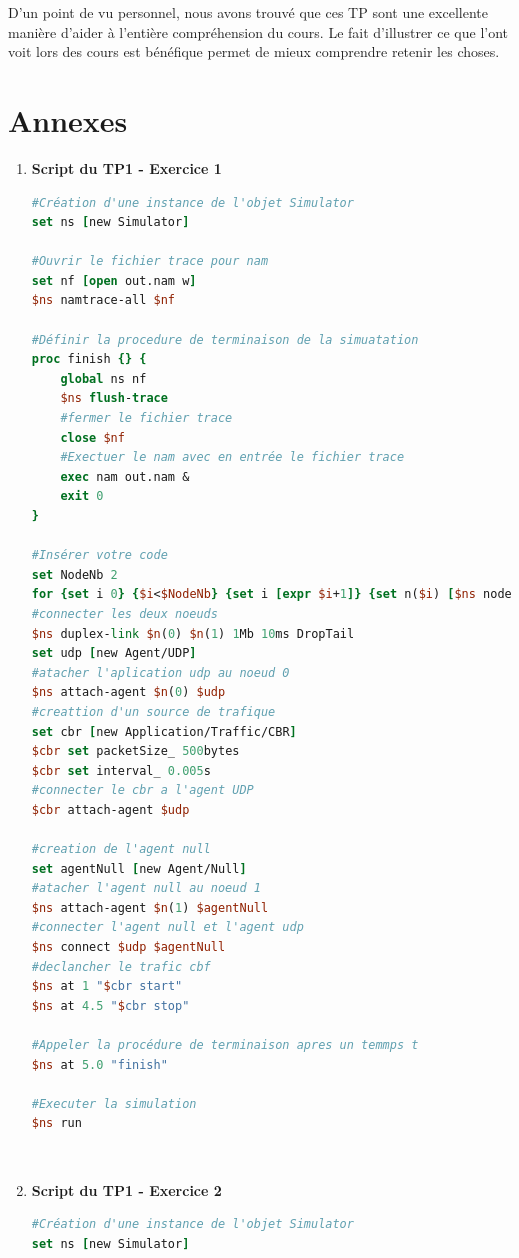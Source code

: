 \documentclass[11pt]{article}
\begin{document}
D'un point de vu personnel, nous avons trouvé que ces TP sont une excellente manière d'aider à l'entière compréhension du cours. Le fait d'illustrer ce que l'ont voit lors des cours est bénéfique permet de mieux comprendre retenir les choses.

\pagebreak
\section*{Annexes}

\begin{enumerate}
	
	\item \textbf{Script du TP1 - Exercice 1}

\begin{lstlisting}[language=tcl, label={tp1Exo1}, caption={TP1 - Exercice1}]
#Création d'une instance de l'objet Simulator
set ns [new Simulator]

#Ouvrir le fichier trace pour nam
set nf [open out.nam w]
$ns namtrace-all $nf

#Définir la procedure de terminaison de la simuatation
proc finish {} {
	global ns nf
	$ns flush-trace
	#fermer le fichier trace
	close $nf
	#Exectuer le nam avec en entrée le fichier trace
	exec nam out.nam &
	exit 0
}

#Insérer votre code
set NodeNb 2
for {set i 0} {$i<$NodeNb} {set i [expr $i+1]} {set n($i) [$ns node]}
#connecter les deux noeuds
$ns duplex-link $n(0) $n(1) 1Mb 10ms DropTail
set udp [new Agent/UDP]
#atacher l'aplication udp au noeud 0
$ns attach-agent $n(0) $udp 
#creattion d'un source de trafique
set cbr [new Application/Traffic/CBR]
$cbr set packetSize_ 500bytes
$cbr set interval_ 0.005s
#connecter le cbr a l'agent UDP
$cbr attach-agent $udp

#creation de l'agent null
set agentNull [new Agent/Null]
#atacher l'agent null au noeud 1
$ns attach-agent $n(1) $agentNull 
#connecter l'agent null et l'agent udp
$ns connect $udp $agentNull 
#declancher le trafic cbf
$ns at 1 "$cbr start"
$ns at 4.5 "$cbr stop"

#Appeler la procédure de terminaison apres un temmps t 
$ns at 5.0 "finish"

#Executer la simulation
$ns run
\end{lstlisting} 

~\\

\item \textbf{Script du TP1 - Exercice 2}
\begin{lstlisting}[language=tcl, label={tp1Exo2}, caption={TP1 - Exercice2}]
#Création d'une instance de l'objet Simulator
set ns [new Simulator]


\end{lstlisting}
\end{enumerate}
\end{document}
